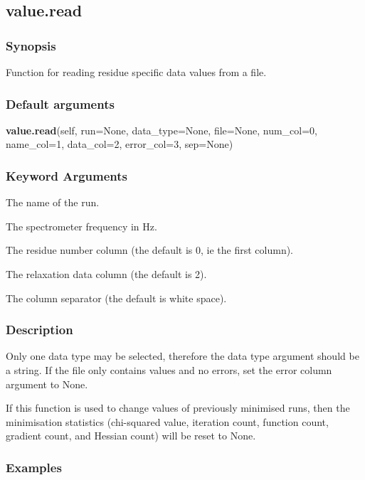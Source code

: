 \newpage

\subsection{value.read}


\subsubsection{Synopsis}

Function for reading residue specific data values from a file.

\subsubsection{Default arguments}

\textsf{\textbf{value.read}(self, run=None, data\_type=None, file=None, num\_col=0, name\_col=1, data\_col=2, error\_col=3, sep=None)}


\subsubsection{Keyword Arguments}

  The name of the run.

  The spectrometer frequency in Hz.

  The residue number column (the default is 0, ie the first column).

  The relaxation data column (the default is 2).

  The column separator (the default is white space).

\subsubsection{Description}

Only one data type may be selected, therefore the data type argument should be a string.  If
the file only contains values and no errors, set the error column argument to None.

If this function is used to change values of previously minimised runs, then the
minimisation statistics (chi-squared value, iteration count, function count, gradient count,
and Hessian count) will be reset to None.


\subsubsection{Examples}

